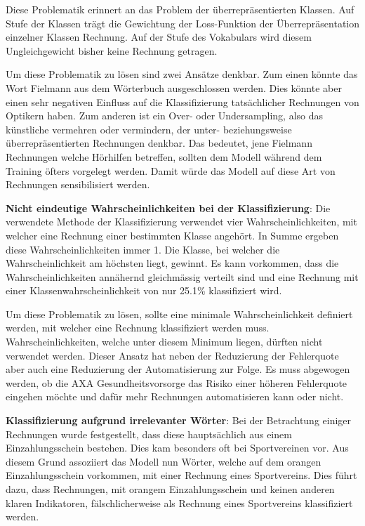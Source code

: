 Diese Problematik erinnert an das Problem der überrepräsentierten Klassen. Auf Stufe der Klassen trägt die Gewichtung der Loss-Funktion der Überrepräsentation einzelner Klassen Rechnung. Auf der Stufe des Vokabulars wird diesem Ungleichgewicht bisher keine Rechnung getragen.

Um diese Problematik zu lösen sind zwei Ansätze denkbar. Zum einen könnte das Wort Fielmann aus dem Wörterbuch ausgeschlossen werden. Dies könnte aber einen sehr negativen Einfluss auf die Klassifizierung tatsächlicher Rechnungen von Optikern haben. Zum anderen ist ein Over- oder Undersampling, also das künstliche vermehren oder vermindern, der unter- beziehungsweise überrepräsentierten Rechnungen denkbar. Das bedeutet, jene Fielmann Rechnungen welche Hörhilfen betreffen, sollten dem Modell während dem Training öfters vorgelegt werden. Damit würde das Modell auf diese Art von Rechnungen sensibilisiert werden.


\textbf{Nicht eindeutige Wahrscheinlichkeiten bei der Klassifizierung}: Die verwendete Methode der Klassifizierung verwendet vier Wahrscheinlichkeiten, mit welcher eine Rechnung einer bestimmten Klasse angehört. In Summe ergeben diese Wahrscheinlichkeiten immer 1. Die Klasse, bei welcher die Wahrscheinlichkeit am höchsten liegt, gewinnt. Es kann vorkommen, dass die Wahrscheinlichkeiten annähernd gleichmässig verteilt sind und eine Rechnung mit einer Klassenwahrscheinlichkeit von nur 25.1\% klassifiziert wird.

Um diese Problematik zu lösen, sollte eine minimale Wahrscheinlichkeit definiert werden, mit welcher eine Rechnung klassifiziert werden muss. Wahrscheinlichkeiten, welche unter diesem Minimum liegen, dürften nicht verwendet werden. Dieser Ansatz hat neben der Reduzierung der Fehlerquote aber auch eine Reduzierung der Automatisierung zur Folge. Es muss abgewogen werden, ob die AXA Gesundheitsvorsorge das Risiko einer höheren Fehlerquote eingehen möchte und dafür mehr Rechnungen automatisieren kann oder nicht.


\textbf{Klassifizierung aufgrund irrelevanter Wörter}: Bei der Betrachtung einiger Rechnungen wurde festgestellt, dass diese hauptsächlich aus einem Einzahlungsschein bestehen. Dies kam besonders oft bei Sportvereinen vor. Aus diesem Grund assoziiert das Modell nun Wörter, welche auf dem orangen Einzahlungsschein vorkommen, mit einer Rechnung eines Sportvereins. Dies führt dazu, dass Rechnungen, mit orangem Einzahlungsschein und keinen anderen klaren Indikatoren, fälschlicherweise als Rechnung eines Sportvereins klassifiziert werden.

